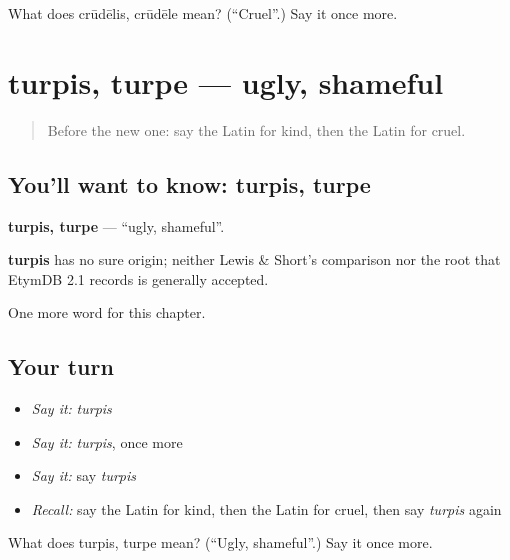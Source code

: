 \begin{tcolorbox}[breakable,colback=teal!4,colframe=teal!35!black,title={Before you move on}]
What does crūdēlis, crūdēle mean? (\textquotedblleft{}Cruel\textquotedblright{}.) Say it once more.
\end{tcolorbox}
\section[turpis, turpe]{turpis, turpe — ugly, shameful}

\label{lesson:LA-C151-turpis}



\begin{quote}
Before the new one: say the Latin for kind, then the Latin for cruel.
\end{quote}

\subsection*{You'll want to know: turpis, turpe}
\textbf{turpis, turpe} — \textquotedblleft{}ugly, shameful\textquotedblright{}.

\begin{cousinweb}
\textbf{turpis} has no sure origin; neither Lewis \& Short's comparison nor the root that EtymDB 2.1 records is generally accepted.
\end{cousinweb}

\begin{grammarlens}[title={What you've built}]
One more word for this chapter.
\end{grammarlens}

\subsection*{Your turn}
\begin{itemize}
\raggedright
  \item \emph{Say it:} \emph{turpis}
  \item \emph{Say it:} \emph{turpis}, once more
  \item \emph{Say it:} say \emph{turpis}
  \item \emph{Recall:} say the Latin for kind, then the Latin for cruel, then say \emph{turpis} again
\end{itemize}

\begin{tcolorbox}[breakable,colback=teal!4,colframe=teal!35!black,title={Before you move on}]
What does turpis, turpe mean? (\textquotedblleft{}Ugly, shameful\textquotedblright{}.) Say it once more.
\end{tcolorbox}
